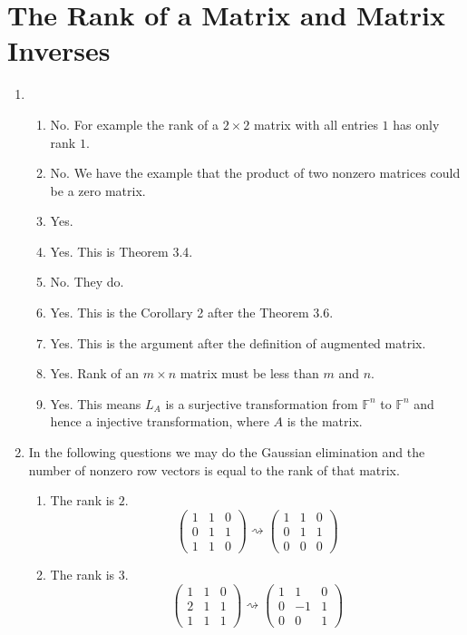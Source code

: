 \section{The Rank of a Matrix and Matrix Inverses}
\begin{enumerate}
\item \begin{enumerate}
\item No. For example the rank of a $2\times 2$ matrix with all entries $1$ has only rank $1$.
\item No. We have the example that the product of two nonzero matrices could be a zero matrix.
\item Yes.
\item Yes. This is Theorem 3.4.
\item No. They do.
\item Yes. This is the Corollary 2 after the Theorem 3.6.
\item Yes. This is the argument after the definition of augmented matrix.
\item Yes. Rank of an $m\times n$ matrix must be less than $m$ and $n$.
\item Yes. This means $L_A$ is a surjective transformation from $\mathbb{F}^n$ to $\mathbb{F}^n$ and hence a injective transformation, where $A$ is the matrix.
\end{enumerate}
\item In the following questions we may do the Gaussian elimination and the number of nonzero row vectors is equal to the rank of that matrix.\begin{enumerate}
\item The rank is $2$.
\[\left(\begin{array}{ccc}1&1&0\\0&1&1\\1&1&0 \end{array}\right)\rightsquigarrow \left(\begin{array}{ccc}1&1&0\\0&1&1\\0&0&0 \end{array}\right)\]
\item The rank is $3$.
\[\left(\begin{array}{ccc}1&1&0\\2&1&1\\1&1&1 \end{array}\right)\rightsquigarrow \left(\begin{array}{ccc}1&1&0\\0&-1&1\\0&0&1 \end{array}\right)\]

\end{enumerate}
\end{enumerate}
